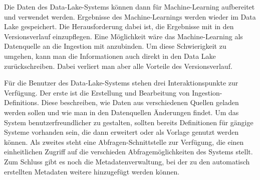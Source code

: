 Die Daten des Data-Lake-Systems können dann für Machine-Learning aufbereitet und verwendet werden.
Ergebnisse des Machine-Learnings werden wieder im Data Lake gespeichert.
Die Herausforderung dabei ist, die Ergebnisse mit in den Versionsverlauf einzupflegen.
Eine Möglichkeit wäre das Machine-Learning als Datenquelle an die Ingestion mit anzubinden.
Um diese Schwierigkeit zu umgehen, kann man die Informationen auch direkt in den Data Lake zurückschreiben.
Dabei verliert man aber alle Vorteile des Versionsverlauf.

Für die Benutzer des Data-Lake-Systems stehen drei Interaktionspunkte zur Verfügung.
Der erste ist die Erstellung und Bearbeitung von Ingestion-Definitions.
Diese beschreiben, wie Daten aus verschiedenen Quellen geladen werden sollen und wie man in den Datenquellen Änderungen findet.
Um das System benutzerfreundlicher zu gestalten, sollten bereits Definitionen für gängige Systeme vorhanden sein, die dann erweitert oder als Vorlage genutzt werden können.
Als zweites steht eine Abfragen-Schnittstelle zur Verfügung, die einen einheitlichen Zugriff auf die verschieden Abfragemöglichkeiten des Systems stellt.
Zum Schluss gibt es noch die Metadatenverwaltung, bei der zu den automatisch erstellten Metadaten weitere hinzugefügt werden können.